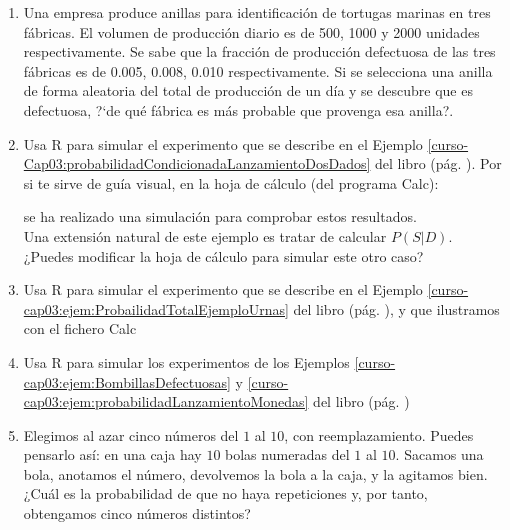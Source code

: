 \documentclass[10pt,a4paper]{article}\usepackage[]{graphicx}\usepackage[]{color}
\begin{document}
\begin{enumerate}
    \item Una empresa produce anillas para identificaci\'on de tortugas marinas en tres fábricas. El volumen de producci\'on diario es de 500, 1000 y 2000 unidades respectivamente. Se sabe  que la fracci\'on de producci\'on defectuosa de las tres fábricas es de 0.005, 0.008, 0.010 respectivamente. Si se selecciona una anilla de forma aleatoria del total de producci\'on de un d\'ia y se descubre que es defectuosa, ?`de qu\'e fábrica es más probable que provenga esa anilla?.




  \item Usa R para simular el experimento que se describe en el Ejemplo \ref{curso-Cap03:probabilidadCondicionadaLanzamientoDosDados} del libro (pág. \pageref{curso-Cap03:probabilidadCondicionadaLanzamientoDosDados}). Por si te sirve de guía visual, en la hoja de cálculo (del programa Calc):
\begin{center} 
\end{center}
se ha realizado una simulación para comprobar estos resultados.\\
Una extensión natural de este ejemplo es tratar de calcular $P(S|D)$. ¿Puedes modificar la hoja de cálculo para simular este otro caso?

  \item  Usa R para simular el experimento que se describe en el Ejemplo \ref{curso-cap03:ejem:ProbailidadTotalEjemploUrnas} del libro (pág. \pageref{curso-cap03:ejem:ProbailidadTotalEjemploUrnas}), y que ilustramos con el fichero  Calc
      \begin{center}
      \end{center}

  \item Usa R para simular los experimentos de los Ejemplos \ref{curso-cap03:ejem:BombillasDefectuosas} y \ref{curso-cap03:ejem:probabilidadLanzamientoMonedas} del libro (pág. \pageref{curso-cap03:ejem:BombillasDefectuosas})



  \item Elegimos al azar cinco números del $1$ al $10$, con reemplazamiento. Puedes pensarlo así: en una caja hay $10$ bolas numeradas del $1$ al $10$. Sacamos una bola, anotamos el número, devolvemos la bola a la caja, y la agitamos bien. ¿Cuál es la probabilidad de que no haya repeticiones y, por tanto, obtengamos cinco números distintos?


\end{enumerate}
\end{document}
